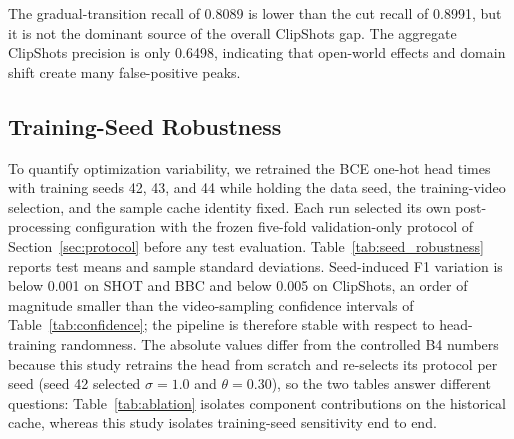 \begin{table}[!t]
\caption{ClipShots Recall by Ground-Truth Transition Type}
\label{tab:clipshots_breakdown}
\centering
\small
\renewcommand{\arraystretch}{1.08}
\end{table}

The gradual-transition recall of 0.8089 is lower than the cut recall of
0.8991, but it is not the dominant source of the overall ClipShots gap.
The aggregate ClipShots precision is only 0.6498, indicating that open-world
effects and domain shift create many false-positive peaks.

\subsection{Training-Seed Robustness}
\label{sec:seed_robustness}

To quantify optimization variability, we retrained the BCE one-hot head
\PaperSeedCount{} times with training seeds 42, 43, and 44 while holding the
data seed, the training-video selection, and the sample cache identity fixed.
Each run selected its own post-processing configuration with the frozen
five-fold validation-only protocol of Section~\ref{sec:protocol} before any
test evaluation. Table~\ref{tab:seed_robustness} reports test means and
sample standard deviations. Seed-induced F1 variation is below 0.001 on SHOT
and BBC and below 0.005 on ClipShots, an order of magnitude smaller than the
video-sampling confidence intervals of Table~\ref{tab:confidence}; the
pipeline is therefore stable with respect to head-training randomness. The
absolute values differ from the controlled B4 numbers because this study
retrains the head from scratch and re-selects its protocol per seed (seed 42
selected $\sigma{=}1.0$ and $\theta{=}0.30$), so the two tables answer
different questions: Table~\ref{tab:ablation} isolates component
contributions on the historical cache, whereas this study isolates
training-seed sensitivity end to end.

\begin{table}[!t]
\caption{Three-Seed Robustness of the End-to-End Pipeline (Mean $\pm$ Sample Standard Deviation Over Training Seeds 42--44)}
\label{tab:seed_robustness}
\centering
\small
\renewcommand{\arraystretch}{1.08}
\end{table}

